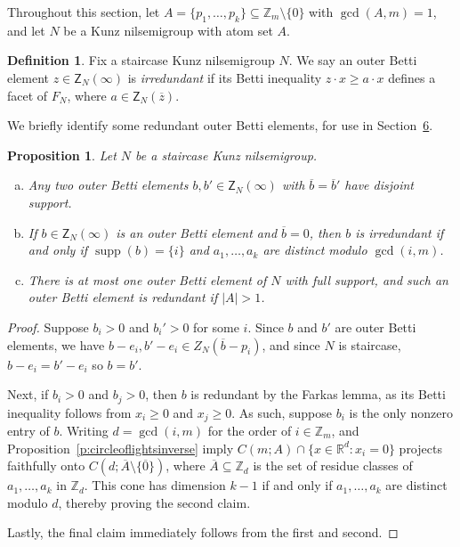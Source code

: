 \documentclass[10pt,a4paper]{amsart}
\newcommand\ZZ{\mathbb{Z}}
\newcommand\RR{\mathbb{R}}
\DeclareMathOperator\supp{supp}
\newtheorem{prop}[thm]{Proposition}
\theoremstyle{definition}\newtheorem{defi}[thm]{Definition}
\begin{document}
Throughout this section, let $A = \{p_1,\ldots,p_k\} \subseteq \ZZ_m \setminus \{0\}$ with $\gcd(A,m) = 1$, and let $N$ be a Kunz nilsemigroup with atom set $A$.  

\begin{defi}\label{d:irredundantinequality}
Fix a staircase Kunz nilsemigroup $N$.  We say an outer Betti element $z \in \mathsf Z_N(\infty)$ is \emph{irredundant} if its Betti inequality $z \cdot x \ge a \cdot x$ defines a facet of $F_N$, where $a \in \mathsf Z_N(\overline z)$.  
\end{defi}

We briefly identify some redundant outer Betti elements, for use in Section~\href{https://alco.centre-mersenne.org/articles/10.5802/alco.425/}{6}.  

\begin{prop}\label{p:reduandantbettis}
Let $N$ be a staircase Kunz nilsemigroup.  
\begin{enumerate}[(a)]
\item 
Any two outer Betti elements $b, b' \in \mathsf Z_N(\infty)$ with $\overline b = \overline b'$ have disjoint support.  

\item 
If $b \in \mathsf Z_N(\infty)$ is an outer Betti element and $\overline b = 0$, then $b$ is irredundant if and only if $\supp(b) = \{i\}$ and $a_1, \ldots, a_k$ are distinct modulo $\gcd(i,m)$.  

\item 
There is at most one outer Betti element of $N$ with full support, and such an outer Betti element is redundant if $|A| > 1$.  

\end{enumerate}
\end{prop}

\begin{proof}
Suppose $b_i > 0$ and $b_i' > 0$ for some $i$.  Since $b$ and $b'$ are outer Betti elements, we have $b - e_i, b' - e_i \in Z_N(\overline b - p_i)$, and since $N$ is staircase, $b - e_i = b' - e_i$ so $b = b'$.  

Next, if $b_i > 0$ and $b_j > 0$, then $b$ is redundant by the Farkas lemma, as its Betti inequality follows from $x_i \ge 0$ and $x_j \ge 0$.  As such, suppose $b_i$ is the only nonzero entry of $b$.  Writing $d = \gcd(i,m)$ for the order of $i \in \ZZ_m$, \cite[Corollary~3.7]{kunzfaces1} and Proposition~\ref{p:circleoflightsinverse} imply $C(m; A) \cap \{x \in \RR^d : x_i = 0\}$ projects faithfully onto $C(d; \overline A \setminus \{\overline 0\})$, where $\overline A \subseteq \ZZ_d$ is the set of residue classes of $a_1, \ldots, a_k$ in $\ZZ_d$.  This cone has dimension $k-1$ if and only if $a_1, \ldots, a_k$ are distinct modulo $d$, thereby proving the second claim.  

Lastly, the final claim immediately follows from the first and second.  
\end{proof}
\end{document}
